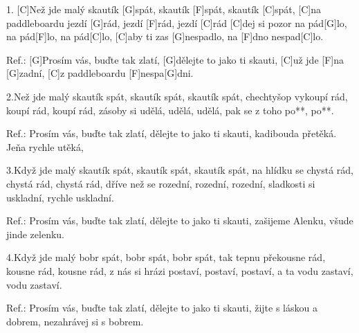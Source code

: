 
1. [C]Než jde malý skautík [G]spát, skautík [F]spát, skautík [C]spát,
[C]na paddleboardu jezdí [G]rád, jezdí [F]rád, jezdí [C]rád
[C]dej si pozor na pád[G]lo, na pád[F]lo, na pád[C]lo,
[C]aby ti zas [G]nespadlo, na [F]dno nespad[C]lo.

Ref.: [G]Prosím vás, buďte tak zlatí,
[G]dělejte to jako ti skauti,
[C] už jde [F]na [G]zadní,
[C]z paddleboardu [F]nespa[G]dni.

2.Než jde malý skautík spát, skautík spát, skautík spát,
chechtyšop vykoupí rád, koupí rád, koupí rád,
zásoby si udělá, udělá, udělá,
pak se z toho po**, po**.

Ref.: Prosím vás, buďte tak zlatí,
dělejte to jako ti skauti,
kadibouda přetěká.
Jeňa rychle utěká,

3.Když jde malý skautík spát, skautík spát, skautík spát,
na hlídku se chystá rád, chystá rád, chystá rád,
dříve než se rozední, rozední, rozední,
sladkosti si uskladní, rychle uskladní.

Ref.: Prosím vás, buďte tak zlatí,
dělejte to jako ti skauti,
zašijeme Alenku,
všude jinde zelenku.

4.Když jde malý bobr spát, bobr spát, bobr spát,
tak tepnu překousne rád, kousne rád, kousne rád,
z nás si hrázi postaví, postaví, postaví,
a ta vodu zastaví, vodu zastaví.

Ref.: Prosím vás, buďte tak zlatí,
dělejte to jako ti skauti,
žijte s láskou a dobrem,
nezahrávej si s bobrem.

